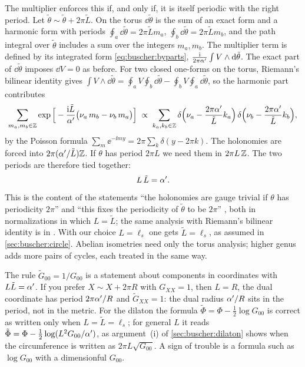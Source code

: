 The multiplier enforces this if, and only if, it is itself periodic with the right period.
Let $\tilde\theta\sim\tilde\theta+2\pi\tilde L$. On the torus $\dd\tilde\theta$ is the sum
of an exact form and a harmonic form with periods $\oint_a\dd\tilde\theta=2\pi\tilde Lm_a$,
$\oint_b\dd\tilde\theta=2\pi\tilde Lm_b$, and the path integral over $\tilde\theta$ includes a
sum over the integers $m_a,m_b$. The multiplier term is defined by its integrated form
\eqref{eq:buscher:byparts}, $\frac{\mathrm{i}}{2\pi\alpha'}\int V\wedge\mathrm{d}\tilde\theta$. The exact
part of $\dd\tilde\theta$ imposes $\dd V=0$ as before. For two closed one-forms on the torus,
Riemann's bilinear identity gives
$\int V\wedge\dd\tilde\theta=\oint_aV\oint_b\dd\tilde\theta-\oint_bV\oint_a\dd\tilde\theta$,
so the harmonic part contributes
\begin{equation}\label{eq:buscher:holonomy}
 \sum_{m_a,m_b\in\mathbb{Z}}\exp\Big[-\frac{\mathrm{i}\tilde L}{\alpha'}\big(\nu_a\,m_b-\nu_b\,m_a\big)\Big]
 \;\propto\;\sum_{k_a,k_b\in\mathbb{Z}}\delta\Big(\nu_a-\frac{2\pi\alpha'}{\tilde L}k_a\Big)\,
   \delta\Big(\nu_b-\frac{2\pi\alpha'}{\tilde L}k_b\Big),
\end{equation}
by the Poisson formula $\sum_m\ee^{-\ii my}=2\pi\sum_k\delta(y-2\pi k)$. The holonomies are
forced into $2\pi(\alpha'/\tilde L)\mathbb{Z}$. If $\theta$ has period $2\pi L$ we need them in
$2\pi L\,\mathbb{Z}$. The two periods are therefore tied together:
\begin{equation}\label{eq:buscher:LL}
 L\,\tilde L=\alpha' .
\end{equation}
This is the content of the statements ``the holonomies are gauge trivial if $\theta$ has
periodicity $2\pi$''  and ``this fixes the periodicity of
$\tilde\theta$ to be $2\pi$'' , both in normalizations in which
$L=\tilde L$; the same analysis with Riemann's bilinear identity is in
. With our choice $L=\ell_s$ one gets $\tilde L=\ell_s$, as
assumed in \cref{sec:buscher:circle}. Abelian isometries need only the torus analysis; higher
genus adds more pairs of cycles, each treated in the same way.

\begin{pitfallbox}
The rule $\tilde G_{00}=1/G_{00}$ is a statement about components in coordinates with
$L\tilde L=\alpha'$. If you prefer $X\sim X+2\pi R$ with $G_{XX}=1$, then $L=R$, the dual
coordinate has period $2\pi\alpha'/R$ and $\tilde G_{XX}=1$: the dual radius $\alpha'/R$ sits in the
period, not in the metric. For the dilaton the formula $\tilde\Phi=\Phi-\frac12\log G_{00}$ is
correct as written only when $L=\tilde L=\ell_s$; for general $L$ it reads
$\tilde\Phi=\Phi-\frac12\log(L^2G_{00}/\alpha')$, as argument~(i) of
\cref{sec:buscher:dilaton} shows when the circumference is written as $2\pi L\sqrt{G_{00}}$.
A sign of trouble is a formula such as $\log G_{00}$ with a dimensionful $G_{00}$.
\end{pitfallbox}

